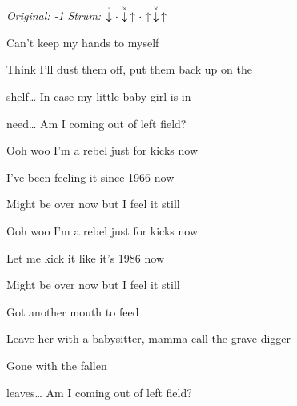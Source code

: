 \begin{song}


\begin{headerbox}
\RaiseBoxWithChucks
{} \quad
\textit{Original: -1} \quad
\textit{Strum:} $\StaccatoDown\Miss\ChuckDown\Up\Miss\Up\ChuckDown\Up$
\end{headerbox}

\begin{vchordbox}
\end{vchordbox}

\large

\bigskip

\Intro {}    \par

\bigskip

Can't keep my hands to myself \par
{} Think I'll dust them off, put them back up on the \par
{}shelf… In case my little baby girl is in \par
{}need… Am I coming out of left field? \par

\bigskip

 Ooh woo I'm a rebel just for kicks now \par
{} I've been feeling it since 1966 now \par
{} Might be over now but I feel it still \par

\bigskip

 Ooh woo I'm a rebel just for kicks now \par
{} Let me kick it like it's 1986 now \par
{} Might be over now but I feel it still \par

\bigskip

Got another mouth to feed \par
{}Leave her with a babysitter, mamma call the grave digger \par
{} Gone with the fallen \par
{}leaves… Am I coming out of left field?  \par

\bigskip


\end{song}
